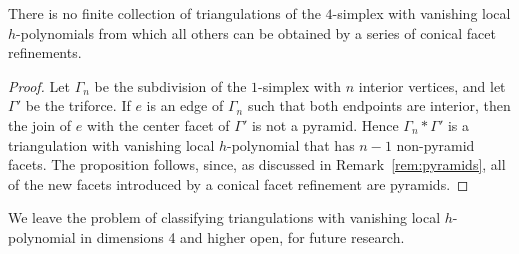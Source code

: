 \documentclass[ALCO,ThmDefs,Unicode,epreuves]{cedram}
\begin{document}
\begin{prop}
There is no finite collection of triangulations of the $4$-simplex with vanishing local $h$-polynomials from which all others can be obtained by a series of conical facet refinements.
\end{prop}

\begin{proof}
Let $\Gamma_n$ be the subdivision of the $1$-simplex with $n$ interior vertices, and let $\Gamma'$ be the triforce. If $e$ is an edge of $\Gamma_n$ such that both endpoints are interior, then the join of $e$ with the center facet of $\Gamma'$ is not a pyramid. Hence $\Gamma_n * \Gamma'$ is a triangulation with vanishing local $h$-polynomial that has $n-1$ non-pyramid facets. The proposition follows, since, as discussed in Remark~\ref{rem:pyramids}, all of the new facets introduced by a conical facet refinement are pyramids.
\end{proof}


\noindent We leave the problem of classifying triangulations with vanishing local $h$-polynomial in dimensions 4 and higher open, for future research.





 
\end{document}
